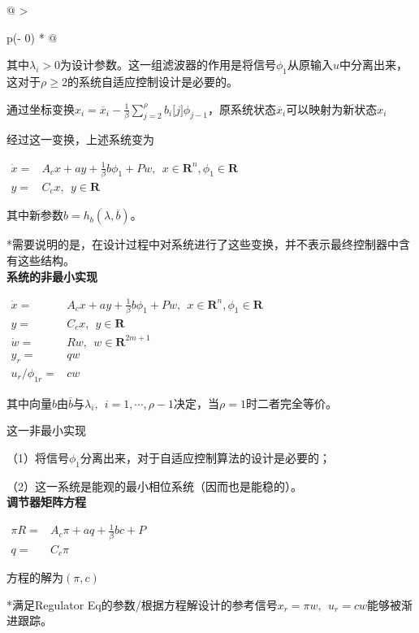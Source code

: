 \documentclass[
  12pt,
  a4paper
]{article}
\begin{document}
\begin{longtable}[]{@{}
  >{\raggedright\arraybackslash}p{}@{}}
其中\(\lambda_{i} > 0\)为设计参数。这一组滤波器的作用是将信号\(\phi_{1}\)从原输入\(u\)中分离出来，这对于\(\rho \geq 2\)的系统自适应控制设计是必要的。

通过坐标变换\(x_{i} = {\overline{x}}_{i} - \frac{1}{\beta}\sum_{j = 2}^{\rho}{b_{i}\lbrack j\rbrack\phi_{j - 1}}\)，原系统状态\({\overline{x}}_{i}\)可以映射为新状态\(x_{i}\)

经过这一变换，上述系统变为

\(\begin{aligned}
\dot{x} = & A_{c}x + ay + \frac{1}{\beta}b\phi_{1} + Pw,\ \ x \in \mathbf{R}^{n},\phi_{1} \in \mathbf{R} \\
y = & C_{c}x,\ \ y \in \mathbf{R}
\end{aligned}\)

其中新参数\(b = h_{b}\left( \lambda,\overline{b} \right)。\)

*需要说明的是，在设计过程中对系统进行了这些变换，并不表示最终控制器中含有这些结构。 \\
\textbf{系统的非最小实现}

\(\begin{aligned}
\dot{x} = & A_{c}x + ay + \frac{1}{\beta}b\phi_{1} + Pw,\ \ x \in \mathbf{R}^{n},\phi_{1} \in \mathbf{R} \\
y = & C_{c}x,\ \ y \in \mathbf{R} \\
\dot{w} = & Rw,\ \ w \in \mathbf{R}^{2m + 1} \\
y_{r} = & qw \\
u_{r}/\phi_{1r} = & cw
\end{aligned}\)

其中向量\(b\)由\(\overline{b}\)与\(\lambda_{i},\ \ i = 1,\cdots,\rho - 1\)决定，当\(\rho = 1\)时二者完全等价。

这一非最小实现

（1）将信号\(\phi_{1}\)分离出来，对于自适应控制算法的设计是必要的；

（2）这一系统是能观的最小相位系统（因而也是能稳的）。 \\
\textbf{调节器矩阵方程}

\(\begin{aligned}
\pi R = & A_{c}\pi + aq + \frac{1}{\beta}bc + P \\
q = & C_{c}\pi
\end{aligned}\)

方程的解为\((\pi,c)\)

*满足Regulator
Eq的参数/根据方程解设计的参考信号\(x_{r} = \pi w,\ \ u_{r} = cw\)能够被渐进跟踪。 \\
\end{longtable}
\end{document}
